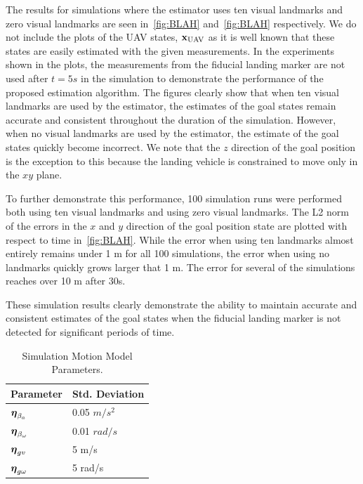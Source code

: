 The results for simulations where the estimator uses ten visual landmarks and
zero visual landmarks are seen in~\ref{fig:BLAH} and~\ref{fig:BLAH}
respectively. We do not include the plots of the UAV states,
$\boldsymbol{\mathrm{x}}_{\text{UAV}}$ as it is well known that these states are easily
estimated with the given measurements. In the experiments shown in the plots,
the measurements from the fiducial landing marker are not used after $t = 5 s$
in the simulation to demonstrate the performance of the proposed estimation
algorithm. The figures clearly show that when ten visual landmarks are used by
the estimator, the estimates of the goal states remain accurate and consistent
throughout the duration of the simulation. However, when no visual landmarks are
used by the estimator, the estimate of the goal states quickly become incorrect.
We note that the $z$ direction of the goal position is the exception to this
because the landing vehicle is constrained to move only in the $xy$ plane.

To further demonstrate this performance, 100 simulation runs were performed
both using ten visual landmarks and using zero visual landmarks. The L2 norm of
the errors in the $x$ and $y$ direction of the goal position state are plotted
with respect to time in~\ref{fig:BLAH}. While the error when using ten landmarks
almost entirely remains under 1 m for all 100 simulations, the error when using
no landmarks quickly grows larger that 1 m. The error for several of the
simulations reaches over 10 m after 30s.

These simulation results clearly demonstrate the ability to maintain accurate
and consistent estimates of the goal states when the fiducial landing marker is
not detected for significant periods of time.


\begin{table}[h!]
  \begin{center}
    \caption{Simulation Motion Model Parameters.}
    \label{tab:sim_process_noises}
    \begin{tabular}{l|l}
      \textbf{Parameter} & \textbf{Std. Deviation} \\
      \hline
      $\boldsymbol{\mathrm{\eta}}_{\beta_a}$ & 0.05 $m/s^2$ \\
      $\boldsymbol{\mathrm{\eta}}_{\beta_\omega}$ & 0.01 $rad/s$ \\
      $\boldsymbol{\mathrm{\eta}}_{gv}$ & 5 m/s \\
      $\boldsymbol{\mathrm{\eta}}_{g\omega}$ & 5 rad/s \\
    \end{tabular}
  \end{center}
\end{table}


